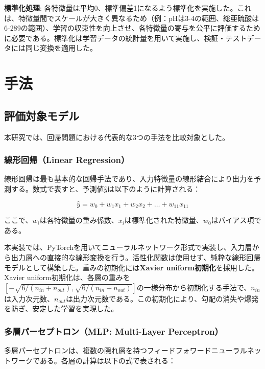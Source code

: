 \documentclass[12pt,a4paper,dvipdfmx]{jsarticle}
\begin{document}
\textbf{標準化処理}: 各特徴量は平均0、標準偏差1になるよう標準化を実施した。これは、特徴量間でスケールが大きく異なるため（例：pHは3-4の範囲、総亜硫酸は6-289の範囲）、学習の収束性を向上させ、各特徴量の寄与を公平に評価するために必要である。標準化は学習データの統計量を用いて実施し、検証・テストデータには同じ変換を適用した。

\section{手法}

\subsection{評価対象モデル}

本研究では、回帰問題における代表的な3つの手法を比較対象とした。

\subsubsection{線形回帰（Linear Regression）}

線形回帰は最も基本的な回帰手法であり、入力特徴量の線形結合により出力を予測する。数式で表すと、予測値$\hat{y}$は以下のように計算される：

\begin{equation}
\hat{y} = w_0 + w_1x_1 + w_2x_2 + \ldots + w_{11}x_{11}
\end{equation}

ここで、$w_i$は各特徴量の重み係数、$x_i$は標準化された特徴量、$w_0$はバイアス項である。

本実装では、PyTorchを用いてニューラルネットワーク形式で実装し、入力層から出力層への直接的な線形変換を行う。活性化関数は使用せず、純粋な線形回帰モデルとして構築した。重みの初期化には\textbf{Xavier uniform初期化}を採用した。Xavier uniform初期化は、各層の重みを$[-\sqrt{6/(n_{in} + n_{out})}, \sqrt{6/(n_{in} + n_{out})}]$の一様分布から初期化する手法で、$n_{in}$は入力次元数、$n_{out}$は出力次元数である。この初期化により、勾配の消失や爆発を防ぎ、安定した学習を実現した。

\subsubsection{多層パーセプトロン（MLP: Multi-Layer Perceptron）}

多層パーセプトロンは、複数の隠れ層を持つフィードフォワードニューラルネットワークである。各層の計算は以下の式で表される：
\end{document}
